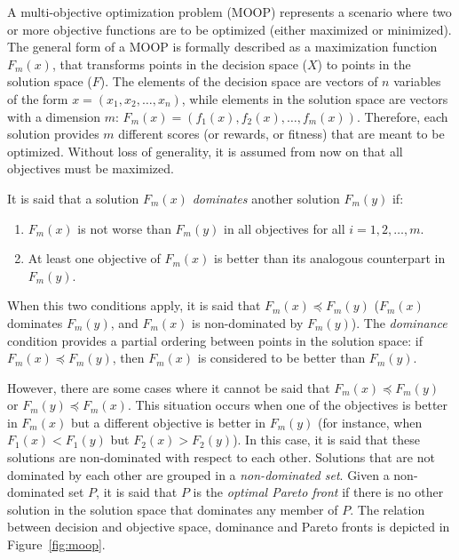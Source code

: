 \documentclass[journal]{IEEEtran}
\begin{document}
A multi-objective optimization problem (MOOP) represents a scenario where two or more objective functions are to be optimized (either maximized or minimized). The general form of a MOOP is formally described as a maximization function $F_m(x)$, that transforms points in the decision space ($X$) to points in the solution space ($F$). The elements of the decision space are vectors of $n$ variables of the form $x = (x_1, x_2, \dots, x_n)$, while elements in the solution space are vectors with a dimension $m$: $F_m(x) = (f_1(x), f_2(x), \dots, f_m(x))$. Therefore, each solution provides $m$ different scores (or rewards, or fitness) that are meant to be optimized. Without loss of generality, it is assumed from now on that all objectives must be maximized.

It is said that a solution $F_m(x)$ \textit{dominates} another solution $F_m(y)$ if:

\begin{enumerate}
\item $F_m(x)$ is not worse than $F_m(y)$ in all objectives for all $i = 1, 2, \dots, m$.
\item At least one objective of $F_m(x)$ is better than its analogous counterpart in $F_m(y)$.
\end{enumerate}


When this two conditions apply, it is said that $F_m(x) \preceq F_m(y)$ ($F_m(x)$ dominates $F_m(y)$, and $F_m(x)$ is non-dominated by $F_m(y)$). The \textit{dominance} condition provides a partial ordering between points in the solution space: if $F_m(x) \preceq F_m(y)$, then $F_m(x)$ is considered to be better than $F_m(y)$.

However, there are some cases where it cannot be said that $F_m(x) \preceq F_m(y)$ or $F_m(y) \preceq F_m(x)$. This situation occurs when one of the objectives is better in $F_m(x)$ but a different objective is better in $F_m(y)$ (for instance, when $F_1(x) < F_1(y)$ but $F_2(x) > F_2(y)$). In this case, it is said that these solutions are non-dominated with respect to each other. Solutions that are not dominated by each other are grouped in a \textit{non-dominated set}. Given a non-dominated set $P$, it is said that $P$ is the \textit{optimal Pareto front} if there is no other solution in the solution space that dominates any member of $P$. The relation between decision and objective space, dominance and Pareto fronts is depicted in Figure~\ref{fig:moop}.
\end{document}
